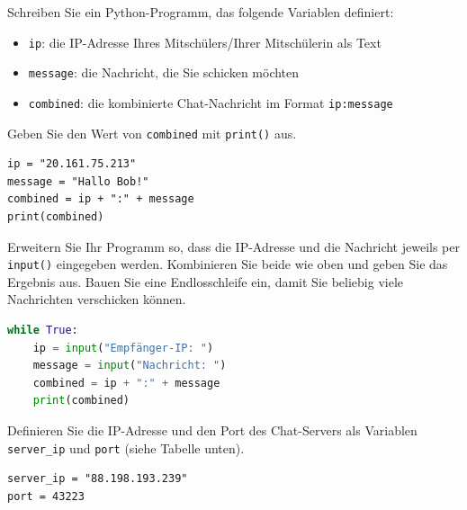 \begin{myexercise}
Schreiben Sie ein Python-Programm, das folgende Variablen definiert:
\begin{itemize}
  \item \texttt{ip}: die IP-Adresse Ihres Mitschülers/Ihrer Mitschülerin als Text
  \item \texttt{message}: die Nachricht, die Sie schicken möchten
  \item \texttt{combined}: die kombinierte Chat-Nachricht im Format \texttt{ip:message}
\end{itemize}
Geben Sie den Wert von \texttt{combined} mit \texttt{print()} aus.
\begin{myanswer}
\begin{lstlisting}
ip = "20.161.75.213"
message = "Hallo Bob!"
combined = ip + ":" + message
print(combined)
\end{lstlisting}
\end{myanswer}
\end{myexercise}

\begin{myexercise}

Erweitern Sie Ihr Programm so, dass die IP-Adresse und die Nachricht jeweils per \texttt{input()} eingegeben werden. Kombinieren Sie beide wie oben und geben Sie das Ergebnis aus. Bauen Sie eine Endlosschleife ein, damit Sie beliebig viele Nachrichten verschicken können.
\begin{myanswer}
\begin{lstlisting}[language=Python]
while True:
    ip = input("Empfänger-IP: ")
    message = input("Nachricht: ")
    combined = ip + ":" + message
    print(combined)
\end{lstlisting}
\end{myanswer}
\end{myexercise}

\begin{myexercise}
Definieren Sie die IP-Adresse und den Port des Chat-Servers als Variablen \lstinline|server_ip| und \lstinline|port| (siehe Tabelle unten).
\begin{myanswer}
\begin{lstlisting}
server_ip = "88.198.193.239"
port = 43223
\end{lstlisting}
\end{myanswer}
\end{myexercise}


